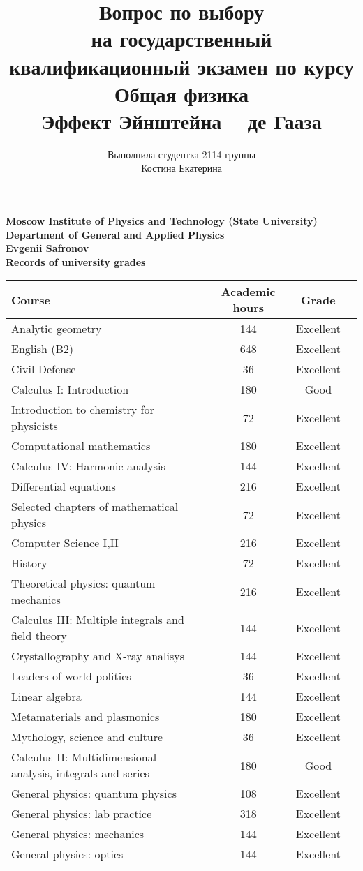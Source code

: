 \documentclass[11pt, a4paper]{report}
\title{\textbf{Вопрос по выбору\\на государственный квалификационный экзамен по курсу Общая физика\\Эффект Эйнштейна -- де Гааза}}
\author{Выполнила студентка 2114 группы\\ Костина Екатерина}
\date{}
\begin{document}
\begin{center}
\textbf{Moscow Institute of Physics and Technology (State University)\\Department of General and Applied Physics\\Evgenii Safronov\\Records of university grades}
\end{center}
\begin{tabular}{|p{6cm}|c|c|c|}
\hline
\textbf{Course}&\textbf{Academic hours} &\textbf{Grade}\\
\hline
Analytic geometry & 144 & Excellent \\
English (B2) & 648 & Excellent \\
Civil Defense & 36 & Excellent \\
Calculus I: Introduction & 180 & Good \\
Introduction to chemistry for physicists & 72 & Excellent \\
Computational mathematics & 180 & Excellent \\
Calculus IV: Harmonic analysis & 144 & Excellent \\
Differential equations & 216 & Excellent \\
Selected chapters of mathematical physics & 72 & Excellent \\
Computer Science I,II & 216 & Excellent \\
History & 72 & Excellent \\
Theoretical physics: quantum mechanics & 216 & Excellent \\
Calculus III: Multiple integrals and field theory & 144 & Excellent \\
Crystallography and X-ray analisys & 144 & Excellent \\
Leaders of world politics & 36 & Excellent \\
Linear algebra & 144 & Excellent \\
Metamaterials and plasmonics & 180 & Excellent \\
Mythology, science and culture & 36 & Excellent \\
Calculus II: Multidimensional analysis, integrals and series & 180 & Good \\
General physics: quantum physics & 108 & Excellent \\
General physics: lab practice & 318 & Excellent \\
General physics: mechanics & 144 & Excellent \\
General physics: optics & 144 & Excellent \\

\end{tabular}
\end{document}

